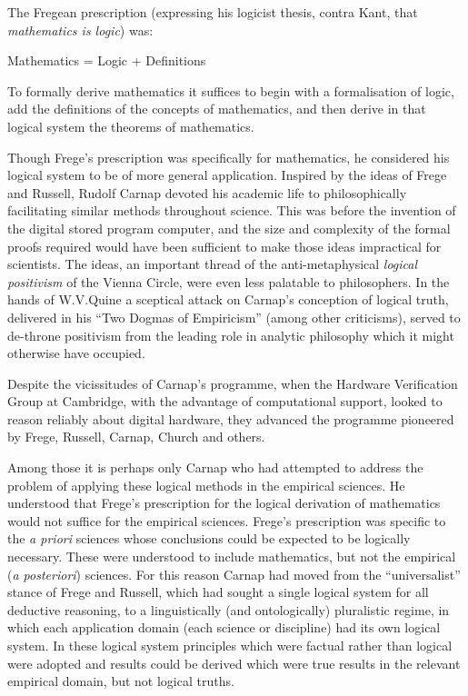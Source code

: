 \documentclass[10pt,titlepage]{book}
\begin{document}
The Fregean prescription (expressing his logicist thesis, contra Kant, that \emph{mathematics is logic}) was:

\begin{center}
  Mathematics = Logic + Definitions
\end{center}

To formally derive mathematics it suffices to begin with a formalisation of logic, add the definitions of the concepts of mathematics, and then derive in that logical system the theorems of mathematics.

Though Frege's prescription was specifically for mathematics, he considered his logical system to be of more general application.
Inspired by the ideas of Frege and Russell, Rudolf Carnap devoted his academic life to philosophically facilitating similar methods throughout science.
This was before the invention of the digital stored program computer, and the size and complexity of the formal proofs required would have been sufficient to make those ideas impractical for scientists.
The ideas, an important thread of the anti-metaphysical \emph{logical positivism} of the Vienna Circle, were even less palatable to philosophers.
In the hands of W.V.Quine a sceptical attack on Carnap's conception of logical truth, delivered in his ``Two Dogmas of Empiricism''\cite{quine53} (among other criticisms), served to de-throne positivism from the leading role in analytic philosophy which it might otherwise have occupied.

Despite the vicissitudes of Carnap's programme, when the Hardware Verification Group at Cambridge, with the advantage of computational support, looked to reason reliably about digital hardware, they advanced the programme pioneered by Frege, Russell, Carnap, Church and others.

Among those it is perhaps only Carnap who had attempted to address the problem of applying these logical methods in the empirical sciences.
He understood that Frege's prescription for the logical derivation of mathematics would not suffice for the empirical sciences.
Frege's prescription was specific to the \emph{a priori} sciences whose conclusions could be expected to be logically necessary.
These were understood to include mathematics, but not the empirical (\emph{a posteriori}) sciences.
For this reason Carnap had moved from the ``universalist'' stance of Frege and Russell, which had sought a single logical system for all deductive reasoning, to a linguistically (and ontologically) pluralistic regime, in which each application domain (each science or discipline) had its own logical system.
In these logical system principles which were factual rather than logical were adopted and results could be derived which were true results in the relevant empirical domain, but not logical truths.
\end{document}
